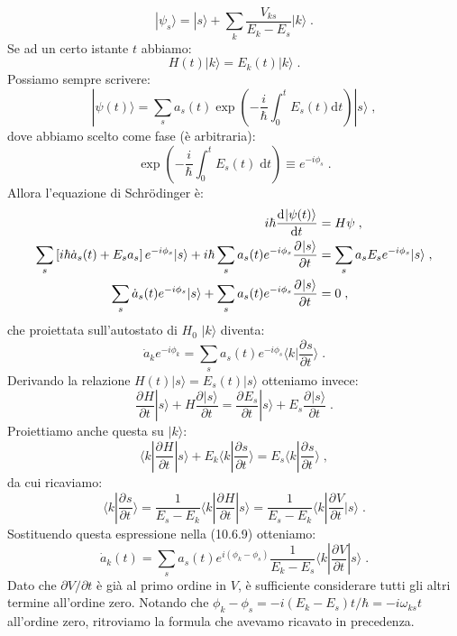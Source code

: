 \documentclass[10pt,a4paper]{report}
\theoremstyle{definition}
\newcommand{\pdev}[3][]{\frac{\partial^{#1} #2}{\partial #3^{#1}}}
\newcommand{\dev}[3][]{\frac{\mathrm{d}^{#1} #2}{\mathrm{d} #3^{#1}}}
\numberwithin{equation}{section}
\newcommand{\diff}[1][]{\mathrm{d}#1}
\newcommand{\bra}{\langle}
\newcommand{\ket}{\rangle}
\newcommand{\Sch}{Schrödinger}
\begin{document}
\begin{equation}
|\psi_s\ket=|s\ket+\sum_k\frac{V_{ks}}{E_k-E_s}|k\ket\;.
\end{equation}
Se ad un certo istante $t$ abbiamo:
\begin{equation}
H(t)|k\ket=E_k(t)|k\ket\;.
\end{equation}
Possiamo sempre scrivere:
\begin{equation}
|\psi(t)\ket=\sum_s a_s(t)\exp\left(-\frac{i}{\hbar}\int_0^t E_s(t)\diff{t}\right)|s\ket\;,
\end{equation}
dove abbiamo scelto come fase (è arbitraria):
\begin{equation}
\exp\left(-\frac{i}{\hbar}\int_0^t E_s(t)\;\diff{t}\right)\equiv e^{-i\phi_s}\;.
\end{equation}
Allora l'equazione di \Sch\; è:
\begin{align}
i\hbar\dev{|\psi(t)\ket}{t} &= H\psi \notag \;,\\
\sum_s\left[i\hbar\dot{a}_s(t)+E_sa_s\right]e^{-i\phi_s}|s\ket+i\hbar\sum_s a_s(t)e^{-i\phi_s}\pdev{|s\ket}{t} &= \sum_s a_sE_se^{-i\phi_s}|s\ket\;, \notag \\
\sum_s \dot{a}_s(t)e^{-i\phi_s}|s\ket +\sum_sa_s(t)e^{-i\phi_s}\pdev{|s\ket}{t}&=0\;,
\end{align}
che proiettata sull'autostato di $H_0$ $|k\ket$ diventa:
\begin{equation}
\dot{a}_ke^{-i\phi_k}=\sum_s a_s(t)e^{-i\phi_s}\bra k|\pdev{s}{t}\ket\;.
\end{equation}
Derivando la relazione $H(t)|s\ket=E_s(t)|s\ket$ otteniamo invece:
\begin{equation}
\pdev{H}{t}|s\ket+H\pdev{|s\ket}{t}=\pdev{E_s}{t}|s\ket+E_s\pdev{|s\ket}{t}\;.
\end{equation}
Proiettiamo anche questa su $|k\ket$:
\begin{equation}
\bra k|\pdev{H}{t}|s\ket+E_k\bra k|\pdev{s}{t}\ket=E_s\bra k|\pdev{s}{t}\ket\;,
\end{equation}
da cui ricaviamo:
\begin{equation}
\bra k|\pdev{s}{t}\ket=\frac{1}{E_s-E_k}\bra k|\pdev{H}{t}|s\ket=\frac{1}{E_s-E_k}\bra k|\pdev{V}{t}|s\ket\;.
\end{equation}
Sostituendo questa espressione nella (10.6.9) otteniamo:
\begin{equation}
\dot{a}_k(t)=\sum_s a_s(t)e^{i(\phi_k-\phi_s)}\frac{1}{E_k-E_s}\bra k|\pdev{V}{t}|s\ket\;.
\end{equation}
Dato che $\partial V/\partial t$ è già al primo ordine in $V$, è sufficiente considerare tutti gli altri termine all'ordine zero. Notando che $\phi_k-\phi_s=-i(E_k-E_s)t/\hbar=-i\omega_{ks}t$ all'ordine zero, ritroviamo la formula che avevamo ricavato in precedenza. \\
\end{document}
